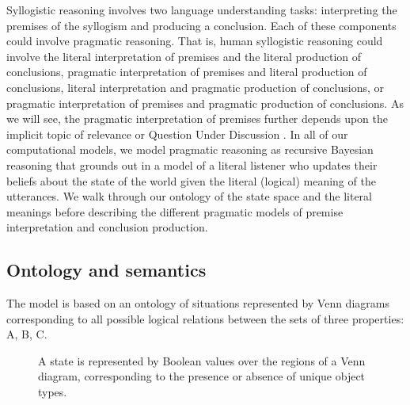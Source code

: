 \documentclass[floatsintext, doc]{apa6}
\begin{document}
Syllogistic reasoning involves two language understanding tasks: interpreting the premises of the syllogism and producing a conclusion.
Each of these components could involve pragmatic reasoning.
That is, human syllogistic reasoning could involve the literal interpretation of premises and the literal production of conclusions, pragmatic interpretation of premises and literal production of conclusions, literal interpretation and pragmatic production of conclusions, or pragmatic interpretation of premises and pragmatic production of conclusions. 
As we will see, the pragmatic interpretation of premises further depends upon the implicit topic of relevance or Question Under Discussion \cite{Roberts2004QUD}.
In all of our computational models, we model pragmatic reasoning as recursive Bayesian reasoning that grounds out in a model of a literal listener who updates their beliefs about the state of the world given the literal (logical) meaning of the utterances. 
We walk through our ontology of the state space and the literal meanings before describing the different pragmatic models of premise interpretation and conclusion production. 


\subsection{Ontology and semantics}

The model is based on an ontology of situations represented by Venn diagrams corresponding to all possible logical relations between the sets of three properties: A, B, C. 

\begin{figure}[h]
\centering
{}
\label{fig:venn}
\caption{A state is represented by Boolean values over the regions of a Venn diagram, corresponding to the presence or absence of unique object types.}
\end{figure}
\end{document}
